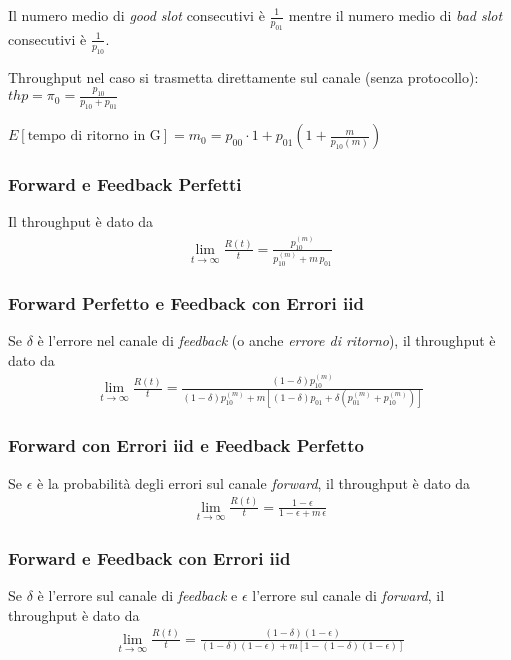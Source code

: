 \documentclass{article}
\begin{document}
Il numero medio di \emph{good slot} consecutivi è $\frac{1}{p_{01}}$ mentre il numero medio di \emph{bad slot} consecutivi è $\frac{1}{p_{10}}$.

Throughput nel caso si trasmetta direttamente sul canale (senza protocollo): $thp = \pi_0 = \frac{p_{10}}{p_{10} + p_{01}}$

$E[\text{tempo di ritorno in G}] = m_0 = p_{00}\cdot 1+p_{01}\left(1+\frac{m}{p_{10}(m)}\right)$

\subsubsection{Forward e Feedback Perfetti}
Il throughput è dato da
\begin{align*}
\lim_{t\to \infty} \frac{R(t)}{t} = \frac{p_{10}^{(m)}}{p_{10}^{(m)} + m\, p_{01}}
\end{align*}

\subsubsection{Forward Perfetto e Feedback con Errori iid}
Se $\delta$ è l'errore nel canale di \emph{feedback} (o anche \emph{errore di ritorno}), il throughput è dato da
\begin{align*}
\lim_{t\to \infty} \frac{R(t)}{t} = \frac{(1-\delta)p_{10}^{(m)}}{(1-\delta)p_{10}^{(m)} + m \left[(1 - \delta)p_{01} + \delta \left( p_{01}^{(m)} + p_{10}^{(m)} \right)\right]}
\end{align*}

\subsubsection{Forward con Errori iid e Feedback Perfetto}
Se $\epsilon$ è la probabilità degli errori sul canale \emph{forward}, il throughput è dato da
\begin{align*}
\lim_{t\to \infty} \frac{R(t)}{t} = \frac{1 - \epsilon}{1 - \epsilon + m\,\epsilon}
\end{align*}

\subsubsection{Forward e Feedback con Errori iid}
Se $\delta$ è l'errore sul canale di \emph{feedback} e $\epsilon$ l'errore sul canale di \emph{forward}, il throughput è dato da
\begin{align*}
\lim_{t\to \infty} \frac{R(t)}{t} = \frac{(1-\delta)(1-\epsilon)}{(1-\delta)(1-\epsilon) + m \left[1-(1-\delta)(1-\epsilon)\right]}
\end{align*}
\end{document}
